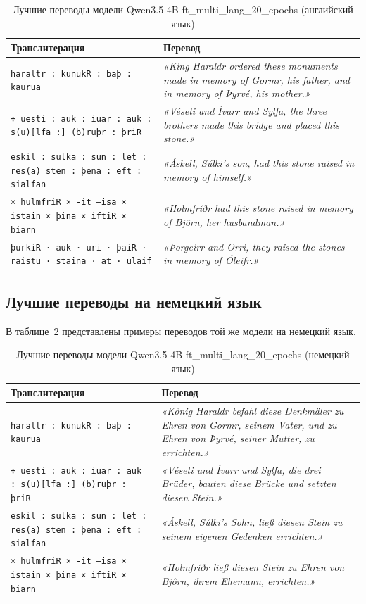 \documentclass[14pt,a4paper]{extreport}
\begin{document}
\begin{table}[H]
\centering
\caption{Лучшие переводы модели Qwen3.5-4B-ft\_multi\_lang\_20\_epochs (английский язык)}
\label{tab:best_qwen4b_translations}
\begin{tabular}{|p{}|p{}|}
\hline
\textbf{Транслитерация} & \textbf{Перевод} \\
\hline
\texttt{haraltr : kunukR : baþ : kaurua} & \textit{«King Haraldr ordered these monuments made in memory of Gormr, his father, and in memory of Þyrvé, his mother.»} \\
\hline
\texttt{÷ uesti : auk : iuar : auk : s(u)[lfa :] (b)ruþr : þriR} & \textit{«Véseti and Ívarr and Sylfa, the three brothers made this bridge and placed this stone.»} \\
\hline
\texttt{eskil : sulka : sun : let : res(a) sten : þena : eft : sialfan} & \textit{«Áskell, Súlki's son, had this stone raised in memory of himself.»} \\
\hline
\texttt{× hulmfriR × -it --isa × istain × þina × iftiR × biarn} & \textit{«Holmfríðr had this stone raised in memory of Bjôrn, her husbandman.»} \\
\hline
\texttt{þurkiR · auk · uri · þaiR · raistu · staina · at · ulaif} & \textit{«Þorgeirr and Orri, they raised the stones in memory of Óleifr.»} \\
\hline
\end{tabular}
\end{table}

\subsection{Лучшие переводы на немецкий язык}

В таблице~\ref{tab:best_qwen4b_de_translations} представлены примеры переводов той же модели на немецкий язык.

\begin{table}[H]
\centering
\caption{Лучшие переводы модели Qwen3.5-4B-ft\_multi\_lang\_20\_epochs (немецкий язык)}
\label{tab:best_qwen4b_de_translations}
\begin{tabular}{|p{}|p{}|}
\hline
\textbf{Транслитерация} & \textbf{Перевод} \\
\hline
\texttt{haraltr : kunukR : baþ : kaurua} & \textit{«König Haraldr befahl diese Denkmäler zu Ehren von Gormr, seinem Vater, und zu Ehren von Þyrvé, seiner Mutter, zu errichten.»} \\
\hline
\texttt{÷ uesti : auk : iuar : auk : s(u)[lfa :] (b)ruþr : þriR} & \textit{«Véseti und Ívarr und Sylfa, die drei Brüder, bauten diese Brücke und setzten diesen Stein.»} \\
\hline
\texttt{eskil : sulka : sun : let : res(a) sten : þena : eft : sialfan} & \textit{«Áskell, Súlki's Sohn, ließ diesen Stein zu seinem eigenen Gedenken errichten.»} \\
\hline
\texttt{× hulmfriR × -it --isa × istain × þina × iftiR × biarn} & \textit{«Holmfríðr ließ diesen Stein zu Ehren von Bjôrn, ihrem Ehemann, errichten.»} \\
\hline
\end{tabular}
\end{table}
\end{document}
